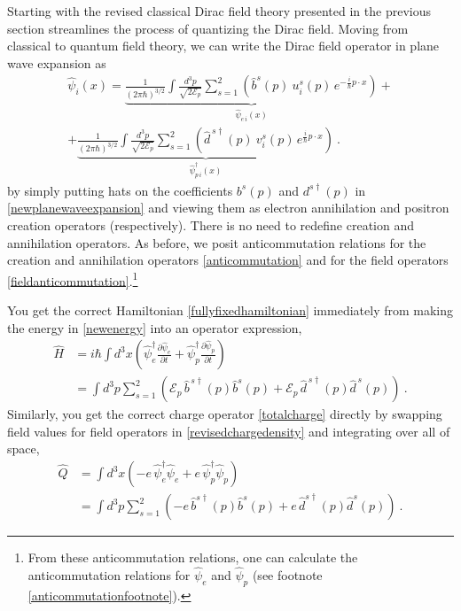 \documentclass[12pt,secnumarabic,amsmath,amssymb,balancelastpage,nofootinbib]{article}
\begin{document}
Starting with the revised classical Dirac field theory presented in the previous section streamlines the process of quantizing the Dirac field.  Moving from classical to quantum field theory, we can write the Dirac field operator in plane wave expansion as
\begin{multline}
\widehat{\psi}_i (x) = \underbrace{\frac{1}{(2\pi\hbar)^{3/2}}\int{ \frac{d^3 p}{\sqrt{2 \mathcal{E}_p}} \sum_{s=1}^2 \left(\widehat{b}^s (p) \: u_i^s (p) \, e^{-\frac{i}{\hbar} p \cdot x}\right)}}_{\mbox{$\widehat{\psi}_{e\,i}(x)$}}
+\\
+ \underbrace{\frac{1}{(2\pi\hbar)^{3/2}}\int{ \frac{d^3 p}{\sqrt{2 \mathcal{E}_p}} \sum_{s=1}^2 \left(\widehat{d}^{\,s\dagger} (p) \: v_i^s (p) \,  e^{\frac{i}{\hbar} p \cdot x}\right)}}_{\mbox{$\widehat{\psi}^\dagger_{p\,i}(x)$}}
\ .
\end{multline}
by simply putting hats on the coefficients $b^s (p)$ and $d^{s\dagger} (p)$ in \eqref{newplanewaveexpansion} and viewing them as electron annihilation and positron creation operators (respectively).  There is no need to redefine creation and annihilation operators.  As before, we posit anticommutation relations for the creation and annihilation operators \eqref{anticommutation} and for the field operators \eqref{fieldanticommutation}.\footnote{From these anticommutation relations, one can calculate the anticommutation relations for $\widehat{\psi}_{e}$ and $\widehat{\psi}_{p}$ (see footnote \ref{anticommutationfootnote}).}


You get the correct Hamiltonian \eqref{fullyfixedhamiltonian} immediately from making the energy in \eqref{newenergy} into an operator expression,
\begin{align}
\widehat{H}&=i \hbar \int{d^3 x \left(\widehat{\psi}_e^{\dagger}\frac{\partial \widehat{\psi}_e}{\partial t} + \widehat{\psi}_p^{\dagger}\frac{\partial \widehat{\psi}_p}{\partial t}\right)}
\nonumber
\\
&=\int{d^3 p \sum_{s=1}^2  \left(\mathcal{E}_p\,\widehat{b}^{\, s\dagger}(p)\widehat{b}^{s}(p)+\mathcal{E}_p\,\widehat{d}^{\, s\dagger}(p)\widehat{d}^{\,s}(p)\right)}
\ .
\end{align}
Similarly, you get the correct charge operator \eqref{totalcharge} directly by swapping field values for field operators in \eqref{revisedchargedensity} and integrating over all of space,
\begin{align}
\widehat{Q}&= \int{d^3 x \left(-e\, \widehat{\psi}_e^\dagger\widehat{\psi}_e  + e\, \widehat{\psi}_p^\dagger\widehat{\psi}_p\right)}
\nonumber
\\
&=\int{d^3 p \sum_{s=1}^2  \left(-e\,\widehat{b}^{s\dagger}(p)\widehat{b}^s(p)+e\,\widehat{d}^{s\dagger}(p)\widehat{d}^{s}(p)\right)}
\ .
\end{align}
\end{document}
